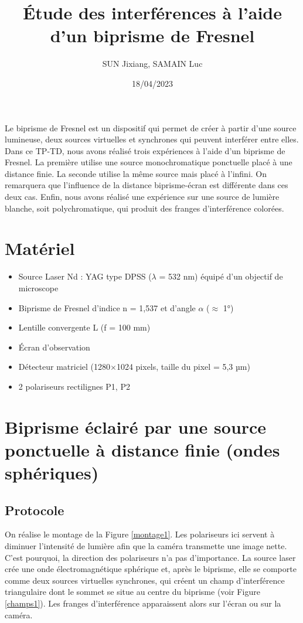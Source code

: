 \documentclass[11pt, a4paper]{article}
\title{Étude des interférences à l'aide d'un biprisme de Fresnel}
\author{SUN Jixiang, SAMAIN Luc}
\date{18/04/2023}
\begin{document}
\maketitle
\thispagestyle{fancy}

Le biprisme de Fresnel est un dispositif qui permet de créer à partir d'une source lumineuse, deux sources virtuelles et synchrones qui peuvent interférer entre elles. Dans ce TP-TD, nous avons réalisé trois expériences à l'aide d'un biprisme de Fresnel. La première utilise une source monochromatique ponctuelle placé à une distance finie. La seconde utilise la même source mais placé à l'infini. On remarquera que l'influence de la distance biprisme-écran est différente dans ces deux cas. Enfin, nous avons réalisé une expérience sur une source de lumière blanche, soit polychromatique, qui produit des franges d'interférence colorées.

\section{Matériel}
\begin{itemize}
    \item Source Laser Nd : YAG type DPSS ($\lambda$ = 532 nm) équipé d'un objectif de microscope
    \item Biprisme de Fresnel d'indice n = 1,537 et d'angle $\alpha$ ($\approx$ 1°)
    \item Lentille convergente L (f = 100 mm)
    \item Écran d'observation
    \item Détecteur matriciel (1280$\times$1024 pixels, taille du pixel = 5,3 µm)
    \item 2 polariseurs rectilignes P1, P2
\end{itemize}


\section{Biprisme éclairé par une source ponctuelle à distance finie (ondes sphériques)}
\subsection{Protocole}
On réalise le montage de la Figure \ref{montage1}. Les polariseurs ici servent à diminuer l'intensité de lumière afin que la caméra transmette une image nette. C'est pourquoi, la direction des polariseurs n'a pas d'importance. La source laser crée une onde électromagnétique sphérique et, après le biprisme, elle se comporte comme deux sources virtuelles synchrones, qui créent un champ d'interférence triangulaire dont le sommet se situe au centre du biprisme (voir Figure \ref{champs1}). Les franges d'interférence apparaissent alors sur l'écran ou sur la caméra.
\end{document}
